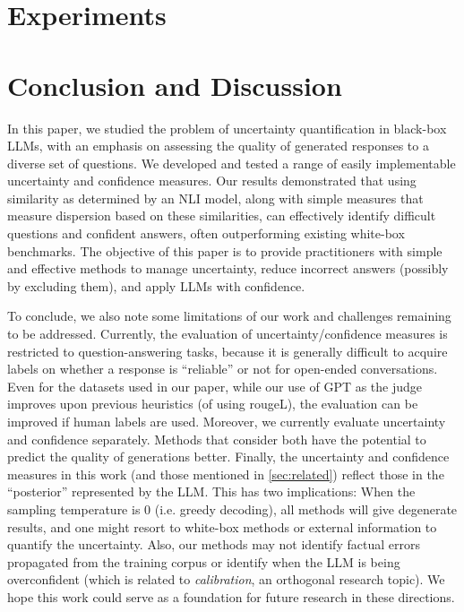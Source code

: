 \documentclass{article} %
\begin{document}
\section{Experiments}\label{sec:exp}



\section{Conclusion and Discussion}\label{sec:conclusion}

In this paper, we studied the problem of uncertainty quantification in black-box LLMs, with an emphasis on assessing the quality of generated responses to a diverse set of questions. We developed and tested a range of easily implementable uncertainty and confidence measures. Our results demonstrated that using similarity as determined by an NLI model, along with simple measures that measure dispersion based on these similarities, can effectively identify difficult questions and confident answers, often outperforming existing white-box benchmarks. The objective of this paper is to provide practitioners with simple and effective methods to manage uncertainty, reduce incorrect answers (possibly by excluding them), and apply LLMs with confidence.

To conclude, we also note some limitations of our work and challenges remaining to be addressed.
Currently, the evaluation of uncertainty/confidence measures is restricted to question-answering tasks, because it is generally difficult to acquire labels on whether a response is ``reliable'' or not for open-ended conversations.
Even for the datasets used in our paper, while our use of GPT as the judge improves upon previous heuristics (of using rougeL), the evaluation can be improved if human labels are used. 
Moreover, we currently evaluate uncertainty and confidence separately.
Methods that consider both have the potential to predict the quality of generations better.
Finally, the uncertainty and confidence measures in this work (and those mentioned in \cref{sec:related}) reflect those in the ``posterior'' represented by the LLM.
This has two implications: When the sampling temperature is 0 (i.e. greedy decoding), all methods will give degenerate results, and one might resort to white-box methods or external information to quantify the uncertainty.
Also, our methods may not identify factual errors propagated from the training corpus or identify when the LLM is being overconfident (which is related to \textit{calibration}, an orthogonal research topic).
We hope this work could serve as a foundation for future research in these directions.

 





\appendix

\end{document}
